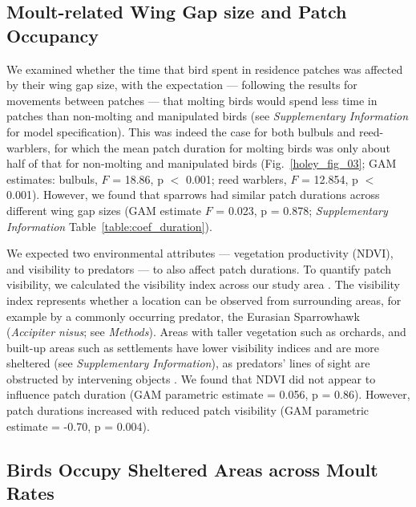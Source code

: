 \subsection*{Moult-related Wing Gap size and Patch Occupancy}

We examined whether the time that bird spent in residence patches was affected by their wing gap size, with the expectation --- following the results for movements between patches --- that molting birds would spend less time in patches than non-molting and manipulated birds (see \textit{Supplementary Information} for model specification).
This was indeed the case for both bulbuls and reed-warblers, for which the mean patch duration for molting birds was only about half of that for non-molting and manipulated birds (Fig.~\ref{holey_fig_03}; GAM estimates: bulbuls, $F$ = 18.86, p $<$ 0.001; reed warblers, $F$ = 12.854, p $<$ 0.001).
However, we found that sparrows had similar patch durations across different wing gap sizes (GAM estimate $F$ = 0.023, p = 0.878; \textit{Supplementary Information} Table~\ref{table:coef_duration}).

We expected two environmental attributes --- vegetation productivity (NDVI), and visibility to predators --- to also affect patch durations.
To quantify patch visibility, we calculated the visibility index across our study area \parencite{olsoy2015,aben2018,aben2021}.
The visibility index represents whether a location can be observed from surrounding areas, for example by a commonly occurring predator, the Eurasian Sparrowhawk (\textit{Accipiter nisus}; see \textit{Methods}).
Areas with taller vegetation such as orchards, and built-up areas such as settlements have lower visibility indices and are more sheltered (see \textit{Supplementary Information}), as predators' lines of sight are obstructed by intervening objects \parencite{olsoy2015}.
We found that NDVI did not appear to influence patch duration (GAM parametric estimate = 0.056, p = 0.86).
However, patch durations increased with reduced patch visibility (GAM parametric estimate = -0.70, p = 0.004).

\subsection*{Birds Occupy Sheltered Areas across Moult Rates}

